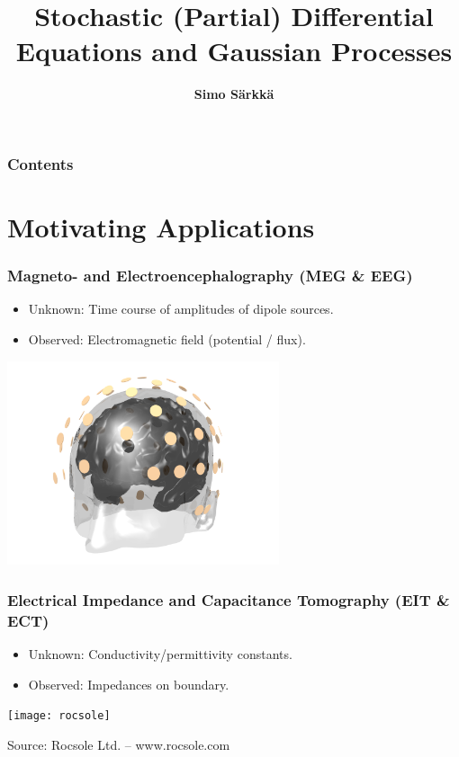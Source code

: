 \documentclass[first=dgreen,second=purple,presentation]{elecslides}
\title{Stochastic (Partial) Differential Equations and Gaussian Processes}
\author{{\bf Simo S\"arkk\"a}}
\institute{Aalto University, Finland}
\date{}
\begin{document}

\aaltotitleframe

\begin{frame}
  \frametitle{Contents}
  \tableofcontents[pausesections]
\end{frame}


\section{Motivating Applications}

\begin{frame}
 \frametitle{Magneto- and Electroencephalography (MEG \& EEG)}

\begin{itemize}[<+->]
\item \alert{Unknown}: Time course of amplitudes of dipole sources.
 \item \alert{Observed}: Electromagnetic field (potential / flux).  
 \end{itemize}
 \begin{center}
 \includegraphics[width=0.6\textwidth]{head-col}
 \end{center}
\end{frame}

\begin{frame}
 \frametitle{Electrical Impedance and Capacitance Tomography (EIT \& ECT)}

 \begin{itemize}[<+->]
 \item \alert{Unknown}: Conductivity/permittivity constants.
 \item \alert{Observed}: Impedances on boundary.  
 \end{itemize}
 \begin{center}
 \texttt{[image: rocsole]}
  
 {\tiny Source: Rocsole Ltd. -- www.rocsole.com}
 \end{center}
\end{frame}
\end{document}
